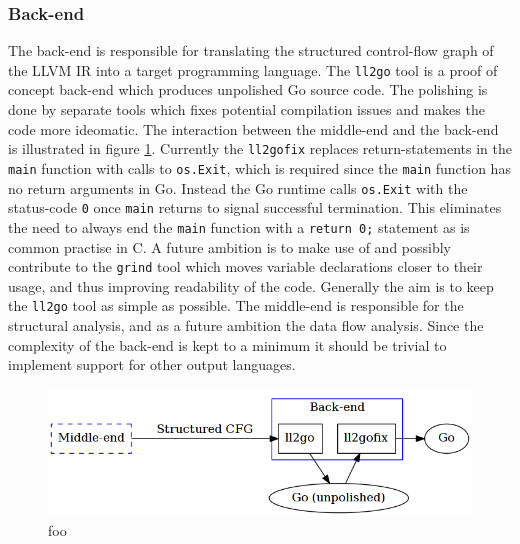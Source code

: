 \documentclass[12pt, a4paper]{article}
\begin{document}
\subsubsection{Back-end}




The back-end is responsible for translating the structured control-flow graph of the LLVM IR into a target programming language. The \texttt{ll2go} tool is a proof of concept back-end which produces unpolished Go source code. The polishing is done by separate tools which fixes potential compilation issues and makes the code more ideomatic. The interaction between the middle-end and the back-end is illustrated in figure \ref{back_end}. Currently the \texttt{ll2gofix} replaces return-statements in the \texttt{main} function with calls to \texttt{os.Exit}, which is required since the \texttt{main} function has no return arguments in Go. Instead the Go runtime calls \texttt{os.Exit} with the status-code \texttt{0} once \texttt{main} returns to signal successful termination. This eliminates the need to always end the \texttt{main} function with a \texttt{return 0;} statement as is common practise in C. A future ambition is to make use of and possibly contribute to the \texttt{grind} tool which moves variable declarations closer to their usage, and thus improving readability of the code. Generally the aim is to keep the \texttt{ll2go} tool as simple as possible. The middle-end is responsible for the structural analysis, and as a future ambition the data flow analysis. Since the complexity of the back-end is kept to a minimum it should be trivial to implement support for other output languages.

\begin{figure}[htbp]
	\begin{center}
		\includegraphics[width=\textwidth]{inc/back-end.png}
		\caption{foo}
		\label{back_end}
	\end{center}
\end{figure}
\end{document}
